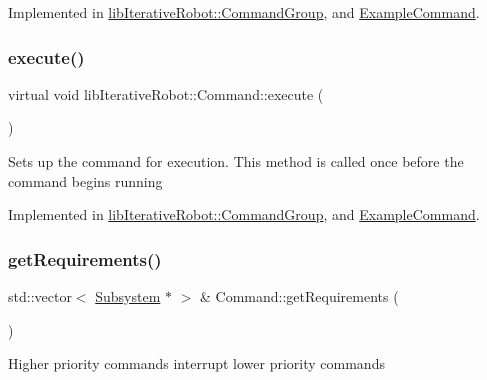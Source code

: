 Implemented in \mbox{\hyperlink{classlib_iterative_robot_1_1_command_group_a28ad3a1c2f6b4f9aea10efa1a824895e}{lib\+Iterative\+Robot\+::\+Command\+Group}}, and \mbox{\hyperlink{class_example_command_ac3da078fdf1e7a7f94488db815bb0457}{Example\+Command}}.

\mbox{\label{classlib_iterative_robot_1_1_command_a4b38164af1a8645fae2fdae296317cf4}} 
\subsubsection{\texorpdfstring{execute()}{execute()}}
{\footnotesize\ttfamily virtual void lib\+Iterative\+Robot\+::\+Command\+::execute (\begin{DoxyParamCaption}{ }\end{DoxyParamCaption})\hspace{0.3cm}{\ttfamily [pure virtual]}}

Sets up the command for execution. This method is called once before the command begins running 

Implemented in \mbox{\hyperlink{classlib_iterative_robot_1_1_command_group_a5e91d370cafde43548d79945ccb4d8fe}{lib\+Iterative\+Robot\+::\+Command\+Group}}, and \mbox{\hyperlink{class_example_command_af6fead537dd568d80aa3097ca207eda5}{Example\+Command}}.

\mbox{\label{classlib_iterative_robot_1_1_command_a447ba6e394f165c6d358471a8bbdc76a}} 
\subsubsection{\texorpdfstring{getRequirements()}{getRequirements()}}
{\footnotesize\ttfamily std\+::vector$<$ \mbox{\hyperlink{classlib_iterative_robot_1_1_subsystem}{Subsystem}} $\ast$ $>$ \& Command\+::get\+Requirements (\begin{DoxyParamCaption}{ }\end{DoxyParamCaption})}

Higher priority commands interrupt lower priority commands \mbox{\label{classlib_iterative_robot_1_1_command_a14543c9d38b07e52f9ffb2af88a63f60}} 
